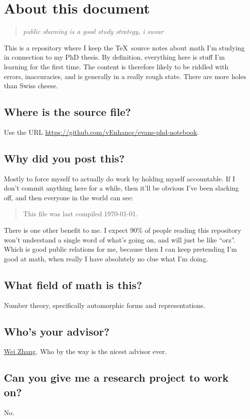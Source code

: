 \chapter*{About this document}
\begin{quote}
\itshape public shaming is a good study strategy, i swear
\end{quote}

This is a repository where I keep the \TeX\ source notes about math I'm studying
in connection to my PhD thesis. By definition, everything here is stuff I'm
learning for the first time. The content is therefore likely to be riddled with
errors, inaccuracies, and is generally in a really rough state. There are more
holes than Swiss cheese.

\section*{Where is the source file?}
Use the URL \url{https://github.com/vEnhance/evans-phd-notebook}.

\section*{Why did you post this?}
Mostly to force myself to actually do work by holding myself accountable. If I
don't commit anything here for a while, then it'll be obvious I've been slacking
off, and then everyone in the world can see:

\begin{quote}
  This file was last compiled \today.
\end{quote}

There is one other benefit to me. I expect 90\% of people reading this repository
won't understand a single word of what's going on, and will just be like ``orz''.
Which is good public relations for me, because then I can keep pretending I'm
good at math, when really I have absolutely no clue what I'm doing.

\section*{What field of math is this?}
Number theory, specifically automorphic forms and representations.

\section*{Who's your advisor?}
\href{https://en.wikipedia.org/wiki/Wei_Zhang_(mathematician)}{Wei Zhang}.
Who by the way is the nicest advisor ever.

\section*{Can you give me a research project to work on?}
No.

